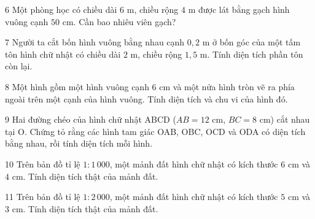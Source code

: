 \gap
\begin{probbox}{6}{\relax}
Một phòng học có chiều dài $6$ m, chiều rộng $4$ m được lát bằng gạch hình vuông cạnh $50$ cm. Cần bao nhiêu viên gạch?
\end{probbox}
\gap
\begin{probbox}{7}{\relax}
Người ta cắt bốn hình vuông bằng nhau cạnh $0{,}2$ m ở bốn góc của một tấm tôn hình chữ nhật có chiều dài $2$ m, chiều rộng $1{,}5$ m. Tính diện tích phần tôn còn lại.
\end{probbox}
\gap
\begin{probbox}{8}{\relax}
Một hình gồm một hình vuông cạnh $6$ cm và một nửa hình tròn vẽ ra phía ngoài trên một cạnh của hình vuông. Tính diện tích và chu vi của hình đó.
\end{probbox}
\gap
\begin{probbox}{9}{\relax}
Hai đường chéo của hình chữ nhật ABCD ($AB=12$ cm, $BC=8$ cm) cắt nhau tại O. Chứng tỏ rằng các hình tam giác OAB, OBC, OCD và ODA có diện tích bằng nhau, rồi tính diện tích mỗi hình.
\end{probbox}
\gap
\begin{probbox}{10}{\relax}
Trên bản đồ tỉ lệ $1:1\,000$, một mảnh đất hình chữ nhật có kích thước $6$ cm và $4$ cm. Tính diện tích thật của mảnh đất.
\end{probbox}
\gap
\begin{probbox}{11}{\relax}
Trên bản đồ tỉ lệ $1:2\,000$, một mảnh đất hình chữ nhật có kích thước $5$ cm và $3$ cm. Tính diện tích thật của mảnh đất.
\end{probbox}
